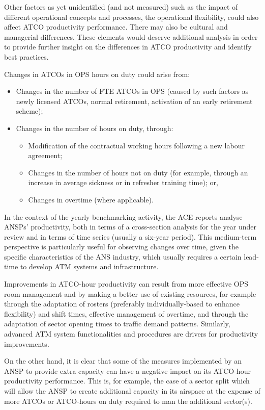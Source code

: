 \documentclass[
  11pt,
  a4paperpaper,
  openany,headsepline=on,footsepline=off,DIV=12,table]{scrbook}
\begin{document}
Other factors as yet unidentified (and not measured) such as the impact
of different operational concepts and processes, the operational
flexibility, could also affect ATCO productivity performance. There may
also be cultural and managerial differences. These elements would
deserve additional analysis in order to provide further insight on the
differences in ATCO productivity and identify best practices.

Changes in ATCOs in OPS hours on duty could arise from:

\begin{itemize}
\item
  Changes in the number of FTE ATCOs in OPS (caused by such factors as
  newly licensed ATCOs, normal retirement, activation of an early
  retirement scheme);
\item
  Changes in the number of hours on duty, through:

  \begin{itemize}
  \item
    Modification of the contractual working hours following a new labour
    agreement;
  \item
    Changes in the number of hours not on duty (for example, through an
    increase in average sickness or in refresher training time); or,
  \item
    Changes in overtime (where applicable).
  \end{itemize}
\end{itemize}

In the context of the yearly benchmarking activity, the ACE reports
analyse ANSPs' productivity, both in terms of a cross-section analysis
for the year under review and in terms of time series (usually a
six-year period). This medium-term perspective is particularly useful
for observing changes over time, given the specific characteristics of
the ANS industry, which usually requires a certain lead-time to develop
ATM systems and infrastructure.

Improvements in ATCO-hour productivity can result from more effective
OPS room management and by making a better use of existing resources,
for example through the adaptation of rosters (preferably
individually-based to enhance flexibility) and shift times, effective
management of overtime, and through the adaptation of sector opening
times to traffic demand patterns. Similarly, advanced ATM system
functionalities and procedures are drivers for productivity
improvements.

On the other hand, it is clear that some of the measures implemented by
an ANSP to provide extra capacity can have a negative impact on its
ATCO-hour productivity performance. This is, for example, the case of a
sector split which will allow the ANSP to create additional capacity in
its airspace at the expense of more ATCOs or ATCO-hours on duty required
to man the additional sector(s).
\end{document}
